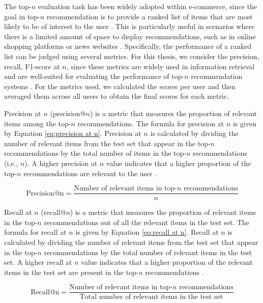 The top-$n$ evaluation task has been widely adopted within e-commerce, since the goal in top-$n$ recommendation is to provide a ranked list of items that are most likely to be of interest to the user \cite{cremonesi2010performance}. This is particularly useful in scenarios where there is a limited amount of space to display recommendations, such as in online shopping platforms or news websites \cite{cremonesi2010performance}. Specifically, the performance of a ranked list can be judged using several metrics. For this thesis, we consider the precision, recall, F1-score at $n$, since these metrics are widely used in information retrieval and are well-suited for evaluating the performance of top-$n$ recommendation systems \cite{cremonesi2010performance}. For the metrics used, we calculated the scores per user and then averaged them across all users to obtain the final scores for each metric. 

Precision at $n$ (precision@$n$) is a metric that measures the proportion of relevant items among the top-$n$ recommendations. The formula for precision at $n$ is given by Equation \ref{eq:precision at n}. Precision at $n$ is calculated by dividing the number of relevant items from the test set that appear in the top-$n$ recommendations by the total number of items in the top-$n$ recommendations (i.e., $n$). A higher precision at $n$ value indicates that a higher proportion of the top-$n$ recommendations are relevant to the user \cite{cremonesi2010performance}.

\begin{equation}
    \mathrm{Precision@n}=\frac{\text{Number of relevant items in top-$n$ recommendations}}{n}
    \label{eq:precision at n}
\end{equation}

Recall at $n$ (recall@$n$) is a metric that measures the proportion of relevant items in the top-$n$ recommendations out of all the relevant items in the test set. The formula for recall at $n$ is given by Equation \ref{eq:recall at n}. Recall at $n$ is calculated by dividing the number of relevant items from the test set that appear in the top-$n$ recommendations by the total number of relevant items in the test set. A higher recall at $n$ value indicates that a higher proportion of the relevant items in the test set are present in the top-$n$ recommendations \cite{cremonesi2010performance}.

\begin{equation}
    \mathrm{Recall@n}=\frac{\text{Number of relevant items in top-$n$ recommendations}}{\text{Total number of relevant items in the test set}}
    \label{eq:recall at n}
\end{equation}

